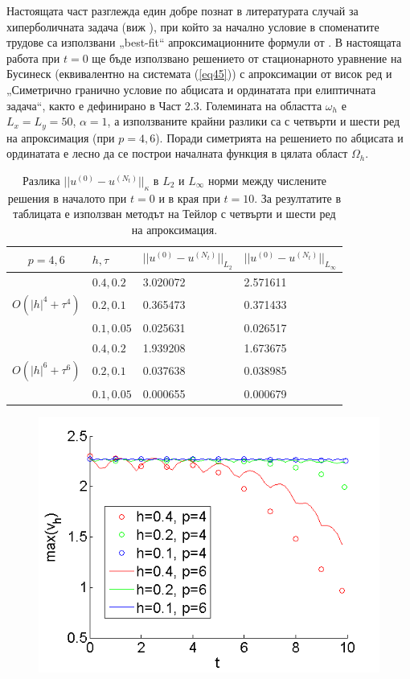 \documentclass[a5paper]{article}
\newcommand{\rf}[1]{(\ref{#1})}
\theoremstyle{remark}
\begin{document}
\begin{large}
Настоящата част разглежда един добре познат в литературата случай за хиперболичната задача (виж \cite{ref21, ref20, ref23, ref22} ), при който за начално условие в споменатите трудове са използвани „best-fit“ апроксимационните формули от \cite{ref15}. В настоящата работа при $t=0$ ще бъде използвано решението от стационарното уравнение на Бусинеск (еквивалентно на системата \rf{eq45}) с апроксимации от висок ред и „Симетрично гранично условие по абцисата и ординатата при елиптичната задача“, както е дефинирано в Част 2.3. Големината на областта $\omega_h$ е $L_x = L_y = 50$, $\alpha = 1$, а използваните крайни разлики са с четвърти и шести ред на апроксимация (при $p=4, 6$). Поради симетрията на решението по абцисата и ординатата е лесно да се построи началната функция в цялата област $\Omega_h$. 
\begin{table}[ht]
\begin{small}
\centering
\small
		\begin{tabular}{||c|l|l|l||}
			\hline
			\hline
  $p=4,6$   &  $h, \tau$ &  $||u^{(0)} - u^{(N_t)}||_{L_2}$  & $||u^{(0)} - u^{(N_t)}||_{L_\infty}$   \\
   		      \hline 
			\hline
           				& $0.4, 0.2$   &  3.020072 & 2.571611     \\
			\hline 
  $O(|h|^4+\tau^4)$ & $0.2, 0.1$   & 0.365473 & 0.371433      \\
			\hline 
           				& $0.1, 0.05$ & 0.025631 & 0.026517      \\
	   \hline
          \hline
           				& $0.4, 0.2$   & 1.939208 & 1.673675      \\
			\hline
  $O(|h|^6+\tau^6)$ & $0.2, 0.1$   & 0.037638 & 0.038985      \\
    \hline
           				& $0.1, 0.05$  & 0.000655 & 0.000679       \\
	   \hline
		\hline 
		\end{tabular}
		\caption{Разлика $||u^{(0)} - u^{(N_t)}||_\kappa$ в $L_2$ и $L_\infty$ норми между числените решения в началото при $t=0$ и в края при $t=10$. За резултатите в таблицата е използван методът на Тейлор с четвърти и шести ред на апроксимация. }
\label{tableK}
\end{small}
\end{table}
\FloatBarrier
\begin{figure}
	\centering
	\includegraphics[width=0.70\linewidth]{Maximum_TaylorZeroBnd_50x50_bt3_c030.png}

\end{figure}
\end{large}
\end{document}
